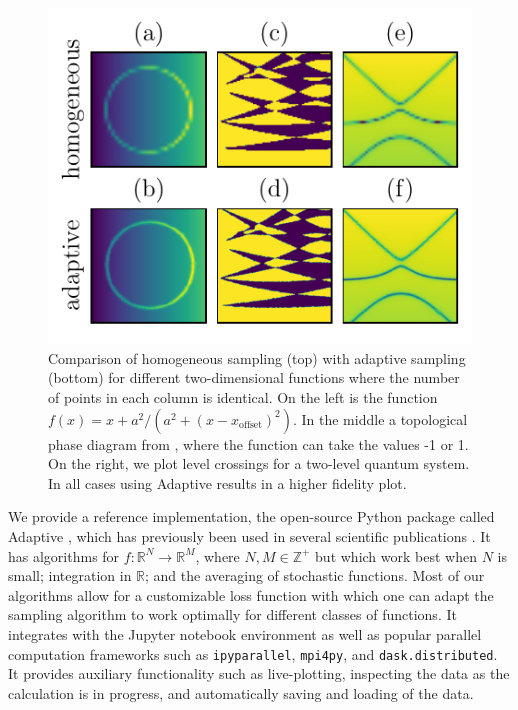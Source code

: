 \begin{figure}
\centering
\includegraphics{chapter_adaptive/figures/Learner2D.pdf}
\caption{Comparison of homogeneous sampling (top) with adaptive sampling (bottom) for different two-dimensional functions where the number of points in each column is identical.
On the left is the function $f(x) = x + a ^ 2 / (a ^ 2 + (x - x_\textrm{offset}) ^ 2)$.
In the middle a topological phase diagram from \cite{Nijholt2016}, where the function can take the values -1 or 1.
On the right, we plot level crossings for a two-level quantum system.
In all cases using Adaptive results in a higher fidelity plot.\label{fig:Learner2D}}
\end{figure}


We provide a reference implementation, the open-source Python package called Adaptive \cite{Nijholt2019}, which has previously been used in several scientific publications \cite{Vuik2018, Laeven2019, Bommer2019, Melo2019}.
It has algorithms for $f \colon \mathbb{R}^N \to \mathbb{R}^M$, where $N, M \in \mathbb{Z}^+$ but which work best when $N$ is small; integration in $\mathbb{R}$; and the averaging of stochastic functions.
Most of our algorithms allow for a customizable loss function with which one can adapt the sampling algorithm to work optimally for different classes of functions.
It integrates with the Jupyter notebook environment as well as popular parallel computation frameworks such as \passthrough{\lstinline!ipyparallel!}, \passthrough{\lstinline!mpi4py!}, and \passthrough{\lstinline!dask.distributed!}.
It provides auxiliary functionality such as live-plotting, inspecting the data as the calculation is in progress, and automatically saving and loading of the data.

